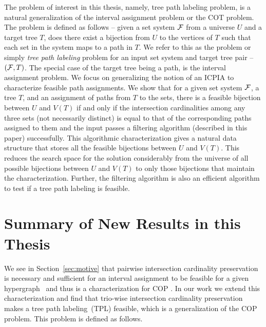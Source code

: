 The problem of interest in this thesis, namely, tree path labeling
problem, is a natural generalization of the interval assignment
problem or the COT problem. The problem is defined as follows -- given
a set system ${\cal F}$ from a universe $U$ and a target tree $T$, does
there exist a bijection from $U$ to the vertices of $T$ such that each
set in the system maps to a path in $T$.  We refer to this as the
{\CFTPL} problem or simply {\em tree path labeling} problem for an
input set system and target tree pair -- $({\cal F},T)$. The special case
of the target tree being a path, is the interval assignment problem.
We focus on generalizing the notion of an ICPIA \cite{nsnrs09} to
characterize feasible path assignments.  We show that for a given set
system ${\cal F}$, a tree $T$, and an assignment of paths from $T$ to the
sets, there is a feasible  bijection between
$U$ and $V(T)$ if and only if the intersection cardinalities among any
three sets (not necessarily distinct) is equal to that of the
corresponding paths assigned to them and the input passes a filtering
algorithm (described in this paper) successfully.  This algorithmic
characterization gives a natural data structure that stores all the
 feasible bijections between $U$ and $V(T)$. This
reduces the search space for the solution considerably from the
universe of all possible bijections between $U$ and $V(T)$ to only
those bijections that maintain the characterization.  Further, the
filtering algorithm is also an efficient algorithm to test if a tree
path labeling is feasible.


\section{Summary of New Results in this Thesis}
\label{sec:results}

We see in Section~\ref{sec:motive} that pairwise intersection
cardinality preservation is necessary and sufficient for an interval
assignment to be feasible for a given hypergraph~ and thus is a characterization for COP
\cite{nsnrs09}.  In our work we extend this characterization
and find that trio-wise intersection cardinality preservation makes a
tree path labeling~\endnotemark[4]  (TPL) feasible, which is a generalization of the COP
problem. This problem is defined as follows.

